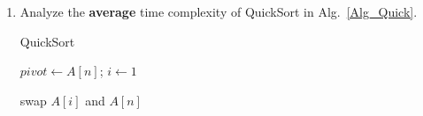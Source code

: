 \documentclass[12pt,a4paper]{article}
\theoremstyle{definition}
\begin{document}
\begin{enumerate}
    \item
    Analyze the \textbf{average} time complexity of QuickSort in Alg.~\ref{Alg_Quick}.

    \begin{minipage}[t]{0.8\textwidth}
    \begin{algorithm}[H]

      \BlankLine
      \caption{QuickSort}\label{Alg_Quick}


      $pivot \leftarrow A[n]$; $i \leftarrow 1$\;

      swap $A[i]$ and $A[n]$\;
    \end{algorithm}
    \end{minipage}


\end{enumerate}
\end{document}

